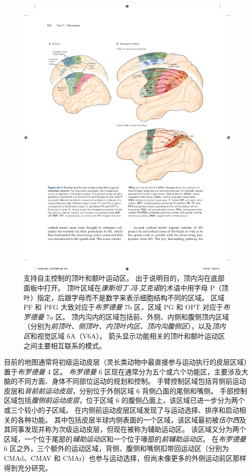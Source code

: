 \begin{figure}[htbp]
	\centering
	\includegraphics[width=1.0\linewidth]{chap34/fig_34_2}
	\caption{支持自主控制的顶叶和额叶运动区。
		出于说明目的，顶内沟在底部面板中打开。
		顶叶区域在\textit{康斯坦丁$\cdot$冯$\cdot$艾克诺}的术语中用字母 P（顶叶）指定，后跟字母而不是数字来表示细胞结构不同的区域。
		区域 PF 和 PFG 大致对应于\textit{布罗德曼} 7b 区，区域 PG 和 OPT 对应于\textit{布罗德曼} 7a 区。
		顶内沟内的区域包括前、外侧、内侧和腹侧顶内区域（分别为\textit{前顶叶}、\textit{侧顶叶}、\textit{内顶叶内区}、\textit{顶内沟腹侧区}），以及\textit{顶内区}和视觉区域 6A（V6A）。
		箭头显示功能相关的顶叶和额叶运动区之间主要相互联系的模式。}
	\label{fig:34_2}
\end{figure}


目前的地图通常将初级运动皮层（灵长类动物中最直接参与运动执行的皮层区域）置于\textit{布罗德曼} 4 区。
\textit{布罗德曼} 6 区现在通常分为五个或六个功能区，主要涉及大脑的不同方面、身体不同部位运动的规划和控制。
手臂控制区域包括背侧前运动皮层和\textit{背前前运动皮层}，分别位于外侧区域 6 背侧凸面的尾侧和嘴侧。
手部控制区域包括\textit{腹侧前运动皮层}，位于区域 6 的腹侧凸面上，该区域已进一步分为两个或三个较小的子区域。
在内侧前运动皮层区域发现了与运动选择、排序和启动相关的各种功能。
其中包括皮层半球内侧表面的一个区域，该区域最初被\textit{伍尔西}及其同事发现并称为次级运动皮层，但现在被称为辅助运动区。
该区域又分为两个区域，一个位于尾部的\textit{辅助运动区}和一个位于喙部的\textit{前辅助运动区}。
在\textit{布罗德曼} 6 区之外，三个额外的运动区域，背侧、腹侧和嘴侧扣带回运动区（分别为 CMAd、CMAV 和 CMAr）也参与运动选择，但尚未像更多的外侧运动前区那样得到充分研究。


